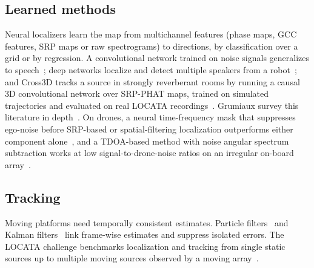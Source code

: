 \subsection{Learned methods}
Neural localizers learn the map from multichannel features (phase maps, GCC features, SRP maps or raw spectrograms) to directions, by classification over a grid or by regression.
A convolutional network trained on noise signals generalizes to speech~\cite{chakrabarty2017doa}; deep networks localize and detect multiple speakers from a robot~\cite{he2018multispeaker}; and Cross3D tracks a source in strongly reverberant rooms by running a causal 3D convolutional network over SRP-PHAT maps, trained on simulated trajectories and evaluated on real LOCATA recordings~\cite{diazguerra2021cross3d}.
Grumiaux \etal survey this literature in depth~\cite{grumiaux2022survey}.
On drones, a neural time-frequency mask that suppresses ego-noise before SRP-based or spatial-filtering localization outperforms either component alone~\cite{wang2022drone}, and a TDOA-based method with noise angular spectrum subtraction works at low signal-to-drone-noise ratios on an irregular on-board array~\cite{manamperi2022drone}.

\subsection{Tracking}
Moving platforms need temporally consistent estimates.
Particle filters~\cite{valin2007tracking} and Kalman filters~\cite{grondin2019lightweight} link frame-wise estimates and suppress isolated errors.
The LOCATA challenge benchmarks localization and tracking from single static sources up to multiple moving sources observed by a moving array~\cite{evers2020locata}.

